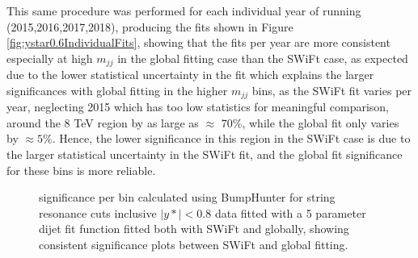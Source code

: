 This same procedure was performed for each individual year of running (2015,2016,2017,2018), producing the fits shown in Figure \ref{fig:ystar0.6IndividualFits}, showing that the fits per year are more consistent especially at high $m_{jj}$ in the global fitting case than the SWiFt case, as expected due to the lower statistical uncertainty in the fit which explains the larger significances with global fitting in the higher $m_{jj}$ bins, as the SWiFt fit varies per year, neglecting 2015 which has too low statistics for meaningful comparison, around the 8 TeV region by as large as $\approx$ 70\%, while the global fit only varies by $\approx 5\%$. Hence, the lower significance in this region in the SWiFt case is due to the larger statistical uncertainty in the SWiFt fit, and the global fit significance for these bins is more reliable.







\begin{figure}[!htb]
  \centering
  \caption{significance per bin calculated using BumpHunter for string resonance cuts inclusive $|y*|<0.8$ data fitted with a 5 parameter dijet fit function fitted both with SWiFt and globally, showing consistent significance plots between SWiFt and global fitting.}
  \label{fig:ystar0.8FullRunBHFits}
\end{figure}


